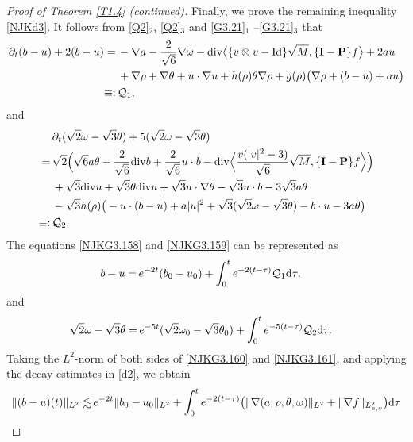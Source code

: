 \documentclass[reqno,11pt]{amsart}
\theoremstyle{plain}
\numberwithin{equation}{section}
\begin{document}
\begin{proof}[Proof of Theorem \ref{T1.4} \emph{(}continued\emph{)}]
 \medskip 
 Finally, we prove the remaining inequality \eqref{NJKd3}. 
 It follows  from \eqref{Q2}$_2$, \eqref{Q2}$_3$ and 
\eqref{G3.21}$_1$ \linebreak  –\eqref{G3.21}$_3$ that
\begin{align}\label{NJKG3.158}
 \partial_t (b-u)+2(b-u) 
=\,&  -\nabla a-\frac{2}{\sqrt{6}}\nabla\omega-{\rm div}
\big\langle\{ v\otimes v-{\rm Id}\} \sqrt{M},\{\mathbf{I}-\mathbf{P}\}f               
    \big\rangle+2au\nonumber\\
&+\nabla \rho+\nabla\theta  +u\cdot\nabla u
+h(\rho)\theta\nabla\rho +g(\rho)  \big(  \nabla\rho +(b-u)+au\big)\nonumber\\
\equiv:\,& \mathcal{Q}_1, 
\end{align}
and
\begin{align}\label{NJKG3.159}
&\partial_t(\sqrt{2}\omega-\sqrt{3}\theta)+5(\sqrt{2}\omega-\sqrt{3}\theta)\nonumber\\ 
=\,& \sqrt{2}\Big(\sqrt{6}a\theta-\frac{2}{\sqrt{6}}{\rm div}b
+\frac{2}{\sqrt{6}}u\cdot b-{\rm div} \Big\langle \frac{v(|v|^2-3)}{\sqrt{6}}\sqrt{M}, 
\{\mathbf{I}-\mathbf{P}\}f   \Big\rangle   \Big)\nonumber\\
&+\sqrt{3}{\rm div}u+\sqrt{3}\theta{\rm div}u
+\sqrt{3} u\cdot\nabla\theta-\sqrt{3} u\cdot b-3\sqrt{3}a\theta\nonumber\\
&-\sqrt{3} h(\rho) \big( -u\cdot(b-u) +a|u|^2 
+\sqrt{3}(\sqrt{2}\omega-\sqrt{3}\theta)-b\cdot u-3a\theta      \big)  \nonumber\\
\equiv:\,& \mathcal{Q}_2.
\end{align}
The equations \eqref{NJKG3.158} and \eqref{NJKG3.159} can be represented as %
\begin{align}\label{NJKG3.160}
b-u=&\, e^{-2t}(b_0-u_0)+\int_{0}^t e^{-2(t-\tau)} \mathcal{Q}_1{\rm d}\tau,    
\end{align}
and
\begin{align}\label{NJKG3.161}
\sqrt{2}\omega-\sqrt{3}\theta=&\, e^{-5t}(\sqrt{2}\omega_0-\sqrt{3}\theta_0)
+\int_{0}^t e^{-5(t-\tau)} \mathcal{Q}_2{\rm d}\tau.   
\end{align} 
Taking the $L^2$-norm of both sides of \eqref{NJKG3.160} and \eqref{NJKG3.161}, and applying 
the decay estimates in \eqref{d2}, we obtain   
\begin{align}\label{NJKG3.162}
\|(b-u)(t)\|_{L^2}\lesssim&\, e^{-2t} \|b_0-u_0\|_{L^2}+\int_0^t e^{-2(t-\tau)}
\big(\|\nabla(a,\rho,\theta,\omega)\|_{L^2}+\|\nabla f\|_{L_{x,v}^2}\big)  {\rm d}\tau\nonumber\\

\end{align}
\end{proof}
\end{document}
